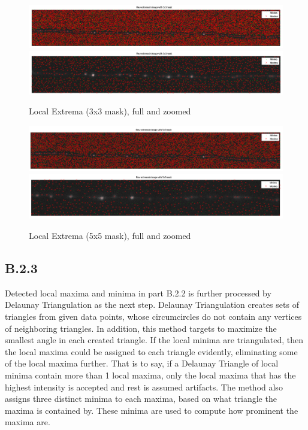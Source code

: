 \documentclass{article}
\begin{document}
\begin{figure}[H]
\centering
\includegraphics[width=16cm]{figures/extrema_3_full.png}
\includegraphics[width=16cm]{figures/extrema_3_zoom.png}
\caption{Local Extrema (3x3 mask), full and zoomed}
\label{fig:extrema_3}
\end{figure}

\begin{figure}[H]
\centering
\includegraphics[width=16cm]{figures/extrema_5_full.png}
\includegraphics[width=16cm]{figures/extrema_5_zoom.png}
\caption{Local Extrema (5x5 mask), full and zoomed}
\label{fig:extrema_5}
\end{figure}



\subsection*{B.2.3}

Detected local maxima and minima in part B.2.2 is further processed by Delaunay Triangulation\cite{delaunaywiki}\cite{delaunaymathworks} as the next step. Delaunay Triangulation creates sets of triangles from given data points, whose circumcircles do not contain any vertices of neighboring triangles. In addition, this method targets to maximize the smallest angle in each created triangle. If the local minima are triangulated, then the local maxima could be assigned to each triangle evidently, eliminating some of the local maxima further. That is to say, if a Delaunay Triangle of local minima contain more than 1 local maxima, only the local maxima that has the highest intensity is accepted and rest is assumed artifacts. The method also assigns three distinct minima to each maxima, based on what triangle the maxima is contained by. These minima are used to compute how prominent the maxima are.
\end{document}
